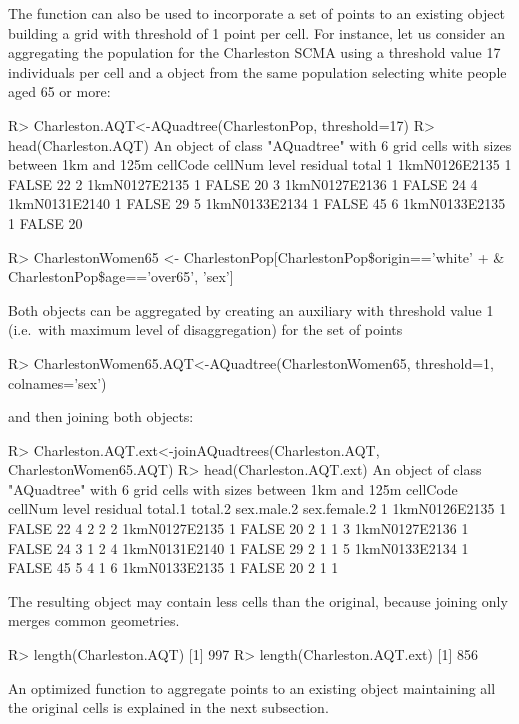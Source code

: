 The  function can also be used to incorporate a set of points to an existing  object building a grid with threshold of 1 point per cell. For instance, let us consider an  aggregating the population for the Charleston SCMA using a threshold value 17 individuals per cell and a  object from the same population selecting white people aged 65 or more:
%
\begin{example*}
R> Charleston.AQT<-AQuadtree(CharlestonPop, threshold=17)
R> head(Charleston.AQT)
An object of class "AQuadtree" with 6 grid cells with sizes between 1km and 
125m 
       cellCode cellNum level residual total
1 1kmN0126E2135             1    FALSE    22
2 1kmN0127E2135             1    FALSE    20
3 1kmN0127E2136             1    FALSE    24
4 1kmN0131E2140             1    FALSE    29
5 1kmN0133E2134             1    FALSE    45
6 1kmN0133E2135             1    FALSE    20
\end{example*}
%
%
\begin{example*}
R> CharlestonWomen65 <- CharlestonPop[CharlestonPop\$origin=='white'
 +	& CharlestonPop\$age=='over65', 'sex']
\end{example*}
%
Both objects can be aggregated by creating an auxiliary  with threshold value 1 (i.e.\ with maximum level of disaggregation) for the set of points
%
\begin{example*}
R> CharlestonWomen65.AQT<-AQuadtree(CharlestonWomen65, threshold=1, colnames='sex')
\end{example*}
%
and then joining both  objects:
%
\begin{example*}
R> Charleston.AQT.ext<-joinAQuadtrees(Charleston.AQT, CharlestonWomen65.AQT)
R> head(Charleston.AQT.ext)
An object of class "AQuadtree" with 6 grid cells with sizes between 1km and
125m 
     cellCode cellNum level residual total.1 total.2 sex.male.2 sex.female.2
1 1kmN0126E2135           1    FALSE      22       4          2            2
2 1kmN0127E2135           1    FALSE      20       2          1            1
3 1kmN0127E2136           1    FALSE      24       3          1            2
4 1kmN0131E2140           1    FALSE      29       2          1            1
5 1kmN0133E2134           1    FALSE      45       5          4            1
6 1kmN0133E2135           1    FALSE      20       2          1            1
\end{example*}
%
The resulting  object may contain less cells than the original, because joining  only merges common geometries.
%
\begin{example*}
R> length(Charleston.AQT)
[1] 997
R> length(Charleston.AQT.ext)
[1] 856
\end{example*}
%
An optimized function to aggregate points to an existing  object maintaining all the original cells is explained in the next subsection.

